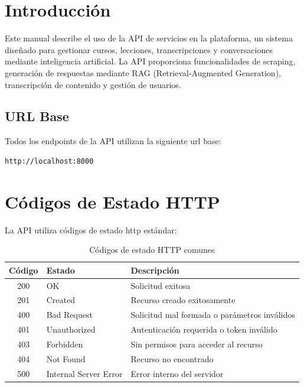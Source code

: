 \section{Introducción}
\label{chapter:A-3-Manual de Usuario}
\label{section:A-3-Introducción}

Este manual describe el uso de la API de servicios en la plataforma, un sistema diseñado para gestionar cursos, lecciones, transcripciones y conversaciones mediante inteligencia artificial. La API proporciona funcionalidades de scraping, generación de respuestas mediante RAG (Retrieval-Augmented Generation), transcripción de contenido y gestión de usuarios.

\subsection{URL Base}
\label{subsection:A-3-URL Base}

Todos los endpoints de la API utilizan la siguiente \acrshort{url} base:

\begin{lstlisting}[language=bash]
http://localhost:8000
\end{lstlisting}

\section{Códigos de Estado HTTP}
\label{section:A-3-Códigos de Estado HTTP}

La API utiliza códigos de estado \acrshort{http} estándar:

\begin{table}[h]
\centering
\begin{tabular}{|c|l|p{7cm}|}
\hline
\textbf{Código} & \textbf{Estado} & \textbf{Descripción} \\
\hline
200 & OK & Solicitud exitosa \\
\hline
201 & Created & Recurso creado exitosamente \\
\hline
400 & Bad Request & Solicitud mal formada o parámetros inválidos \\
\hline
401 & Unauthorized & Autenticación requerida o \gls{token} inválido \\
\hline
403 & Forbidden & Sin permisos para acceder al recurso \\
\hline
404 & Not Found & Recurso no encontrado \\
\hline
500 & Internal Server Error & Error interno del servidor \\
\hline
\end{tabular}
\caption{Códigos de estado HTTP comunes}
\end{table}

